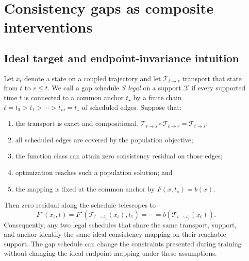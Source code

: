 \documentclass{article}
\newif\ifshowcomments
\newcommand{\claimnote}[1]{%
  \ifshowcomments{\color{claimpurple}\textbf{[CLAIM CEILING: #1]}}\fi}
\begin{document}
\claimnote{The paper's novelty is the ECT composite intervention and its
finite-training geometry. Do not re-center the narrative on RAdam history,
balanced beta, optimizer scale invariance, or a universal best gap.}

\section{Consistency gaps as composite interventions}
\label{sec:theory}

\subsection{Ideal target and endpoint-invariance intuition}
\label{sec:theory-ideal-endpoint}

Let $x_t$ denote a state on a coupled trajectory and let
$\mathcal{T}_{t\rightarrow r}$ transport that state from $t$ to $r\leq t$.
We call a gap schedule $S$ \emph{legal} on a support $\mathcal{X}$ if every
supported time $t$ is connected to a common anchor $t_\star$ by a finite chain
$t=t_0>t_1>\cdots>t_m=t_\star$ of scheduled edges. Suppose that:
\begin{enumerate}
  \item the transport is exact and compositional,
  $\mathcal{T}_{r\rightarrow s}\!\circ\mathcal{T}_{t\rightarrow r}
  =\mathcal{T}_{t\rightarrow s}$;
  \item all scheduled edges are covered by the population objective;
  \item the function class can attain zero consistency residual on those edges;
  \item optimization reaches such a population solution; and
  \item the mapping is fixed at the common anchor by
  $F(x,t_\star)=b(x)$.
\end{enumerate}
Then zero residual along the schedule telescopes to
\begin{equation}
  F^\star(x_t,t)
  =F^\star\!\left(\mathcal{T}_{t\rightarrow t_1}(x_t),t_1\right)
  =\cdots
  =b\!\left(\mathcal{T}_{t\rightarrow t_\star}(x_t)\right).
  \label{eq:ideal-endpoint-invariance}
\end{equation}
Consequently, any two legal schedules that share the same transport, support,
and anchor identify the same ideal consistency mapping on their reachable
support. The gap schedule can change the constraints presented during training
without changing the ideal endpoint mapping under these assumptions.
\end{document}
